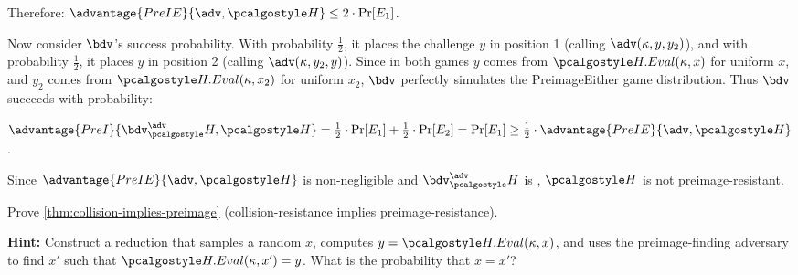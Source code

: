 \begin{mysolution}
  Therefore: $\advantage{PreIE}{\adv, \algo{H}} \leq 2 \cdot \Pr[E_1]$.
  
  Now consider $\bdv$'s success probability. With probability $\frac{1}{2}$, it places the challenge $y$ in position 1 (calling $\adv(\kappa, y, y_2)$), and with probability $\frac{1}{2}$, it places $y$ in position 2 (calling $\adv(\kappa, y_2, y)$).
  Since in both games $y$ comes from $\algo{H.Eval}(\kappa, x)$ for uniform $x$, and $y_2$ comes from $\algo{H.Eval}(\kappa, x_2)$ for uniform $x_2$, $\bdv$ perfectly simulates the PreimageEither game distribution. Thus $\bdv$ succeeds with probability:
  
  $\advantage{PreI}{\bdv^\adv_\algo{H}, \algo{H}} = \frac{1}{2} \cdot \Pr[E_1] + \frac{1}{2} \cdot \Pr[E_2] = \Pr[E_1] \geq \frac{1}{2} \cdot \advantage{PreIE}{\adv, \algo{H}}$.
  
  Since $\advantage{PreIE}{\adv, \algo{H}}$ is non-negligible and $\bdv^\adv_\algo{H}$ is \ppt, $\algo{H}$ is not preimage-resistant.
\end{mysolution}
\fi

\begin{exercise}\label{ex:collision-implies-preimage}
  Prove \autoref{thm:collision-implies-preimage} (collision-resistance implies preimage-resistance).
  
  \textbf{Hint:} Construct a reduction that samples a random $x$, computes $y = \algo{H.Eval}(\kappa, x)$, and uses the preimage-finding adversary to find $x'$ such that $\algo{H.Eval}(\kappa, x') = y$. What is the probability that $x = x'$?
\end{exercise}

